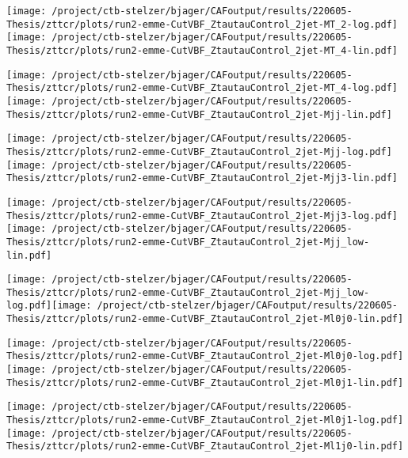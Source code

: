 \documentclass{article}
\begin{document}
\texttt{[image: /project/ctb-stelzer/bjager/CAFoutput/results/220605-Thesis/zttcr/plots/run2-emme-CutVBF\_ZtautauControl\_2jet-MT\_2-log.pdf]}\texttt{[image: /project/ctb-stelzer/bjager/CAFoutput/results/220605-Thesis/zttcr/plots/run2-emme-CutVBF\_ZtautauControl\_2jet-MT\_4-lin.pdf]}

\texttt{[image: /project/ctb-stelzer/bjager/CAFoutput/results/220605-Thesis/zttcr/plots/run2-emme-CutVBF\_ZtautauControl\_2jet-MT\_4-log.pdf]}\texttt{[image: /project/ctb-stelzer/bjager/CAFoutput/results/220605-Thesis/zttcr/plots/run2-emme-CutVBF\_ZtautauControl\_2jet-Mjj-lin.pdf]}

\texttt{[image: /project/ctb-stelzer/bjager/CAFoutput/results/220605-Thesis/zttcr/plots/run2-emme-CutVBF\_ZtautauControl\_2jet-Mjj-log.pdf]}\texttt{[image: /project/ctb-stelzer/bjager/CAFoutput/results/220605-Thesis/zttcr/plots/run2-emme-CutVBF\_ZtautauControl\_2jet-Mjj3-lin.pdf]}

\texttt{[image: /project/ctb-stelzer/bjager/CAFoutput/results/220605-Thesis/zttcr/plots/run2-emme-CutVBF\_ZtautauControl\_2jet-Mjj3-log.pdf]}\texttt{[image: /project/ctb-stelzer/bjager/CAFoutput/results/220605-Thesis/zttcr/plots/run2-emme-CutVBF\_ZtautauControl\_2jet-Mjj\_low-lin.pdf]}

\texttt{[image: /project/ctb-stelzer/bjager/CAFoutput/results/220605-Thesis/zttcr/plots/run2-emme-CutVBF\_ZtautauControl\_2jet-Mjj\_low-log.pdf]}\texttt{[image: /project/ctb-stelzer/bjager/CAFoutput/results/220605-Thesis/zttcr/plots/run2-emme-CutVBF\_ZtautauControl\_2jet-Ml0j0-lin.pdf]}

\texttt{[image: /project/ctb-stelzer/bjager/CAFoutput/results/220605-Thesis/zttcr/plots/run2-emme-CutVBF\_ZtautauControl\_2jet-Ml0j0-log.pdf]}\texttt{[image: /project/ctb-stelzer/bjager/CAFoutput/results/220605-Thesis/zttcr/plots/run2-emme-CutVBF\_ZtautauControl\_2jet-Ml0j1-lin.pdf]}

\texttt{[image: /project/ctb-stelzer/bjager/CAFoutput/results/220605-Thesis/zttcr/plots/run2-emme-CutVBF\_ZtautauControl\_2jet-Ml0j1-log.pdf]}\texttt{[image: /project/ctb-stelzer/bjager/CAFoutput/results/220605-Thesis/zttcr/plots/run2-emme-CutVBF\_ZtautauControl\_2jet-Ml1j0-lin.pdf]}
\end{document}

